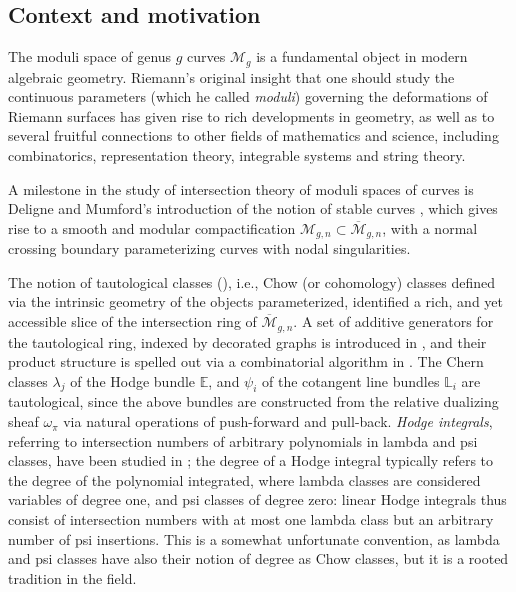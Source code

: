 \documentclass[leqno,12pt]{amsart}
\theoremstyle{remark}
\numberwithin{equation}{section}
\begin{document}
\subsection{Context and motivation}

The moduli space of genus $g$ curves $\mathcal{M}_g$ is a fundamental object in modern algebraic geometry. Riemann's original insight that one should study the continuous parameters (which he called {\it moduli}) governing the deformations of Riemann surfaces has given rise to rich developments in geometry, as well as to several fruitful connections to other fields of mathematics and science, including combinatorics, representation theory, integrable systems and string theory.

A milestone in the study of intersection theory of moduli spaces of curves is Deligne and Mumford's introduction of the notion of stable curves \cite{DMspace}, which gives rise to a smooth and modular compactification  $\mathcal{M}_{g,n}\subset \overline{\mathcal{M}}_{g,n}$, with a normal crossing boundary parameterizing curves with nodal singularities.

The notion of tautological classes (\cite{ac:cag, morita84, Mumford1983}), i.e., Chow (or cohomology) classes defined via the intrinsic geometry of the objects parameterized, identified a rich, and yet accessible slice of the intersection ring of $\overline{\mathcal{M}}_{g,n}$. A set of additive generators for the tautological ring, indexed by decorated graphs is introduced in \cite{graberpandharipande}, and their product structure is spelled out via a combinatorial algorithm in \cite{graberpandharipande, Yang,yang2010intersection}.  
The Chern classes $\lambda_j$ of the Hodge bundle $\mathbb{E}$, and $\psi_i$ of the cotangent line bundles $\mathbb{L}_i$ are tautological, since the above bundles are constructed from the relative dualizing sheaf $\omega_\pi$ via natural operations of push-forward and pull-back.  {\it Hodge integrals}, referring to intersection numbers of arbitrary polynomials in lambda and psi classes, have been studied in \cite{FINC,faber2000hodge, faber2000logarithmic}; the degree of a Hodge integral typically refers to the degree of the polynomial integrated,  where lambda classes are considered variables of degree one, and psi classes of degree zero:  linear Hodge integrals thus consist of intersection numbers with at most one lambda class but an arbitrary number of psi insertions. This is a somewhat unfortunate convention, as lambda and psi classes have also their notion of degree as Chow classes, but it is a rooted tradition in the field.
\end{document}
